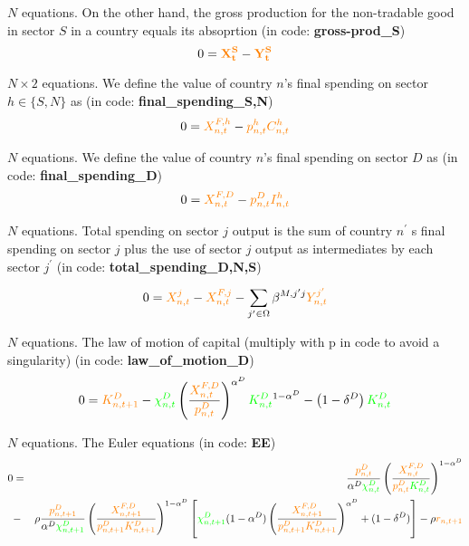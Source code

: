 \documentclass[12pt, bibtotoc, tablecaptionabove, figurecaptionabove, fleqn]{article}
\newcommand{\cl}[1]{{\color{orange}{#1}}}
\newcommand{\st}[1]{{\color{green}{#1}}}
\begin{document}
\noindent $N$ equations. On the other hand, the gross production for the non-tradable good in sector $S$ in a country equals its absoprtion (in code: {\bf{gross-prod\_S}})
\begin{equation}
0 = \mathbf{\cl{X^S_t}} -  \mathbf{\cl{Y^S_t}}
\end{equation}

\noindent $N \times 2$ equations. We define the value of country $n$'s final spending on sector $h \in \{S,N\}$ as (in code: {\bf{final\_spending\_S,N}}) 
\begin{equation}
0 = \cl{ X^{F,h}_{n,t}} - \cl{p^h_{n,t}} \cl{C^h_{n,t}}
\end{equation}

\noindent $N$ equations. We define the value of country $n$'s final spending on sector $D$ as  
(in code: {\bf{final\_spending\_D}}) 
\begin{equation}
0 = \cl{ X^{F,D}_{n,t}} - \cl{p^D_{n,t}} \cl{I^h_{n,t}}
\end{equation}

\noindent $N$ equations. Total spending on sector $j$ output is the sum of country $n^{\prime}$ s final spending on sector $j$
plus the use of sector $j$ output as intermediates by each sector $j^{\prime}$ (in code: {\bf{total\_spending\_D,N,S}}) 

\begin{equation}
0 = \cl{X_{n, t}^{j}} - \cl{X_{n, t}^{F, j}} - \sum_{j^{\prime} \in \Omega} \beta^{M, j^{\prime} j} \cl{Y_{n, t}^{j^{\prime}}}
\end{equation}

\noindent $N$ equations. The law of motion of capital (multiply with p in code to avoid a singularity) (in code: {\bf{law\_of\_motion\_D}}) 
\begin{equation}
0 = \cl{K^D_{n,t+1}} - \st{\chi^D_{n,t}} \left( \frac{\cl{X_{n,t}^{F,D}}}{\cl{p_{n,t}^D}} \right)^{\alpha^D} \st{K^D_{n,t}}^{1-\alpha^D} - \left(1 - \delta^D\right) \st{K^D_{n,t}}
\end{equation}

\noindent $N$ equations. The Euler equations (in code: {\bf{EE}})
\begin{eqnarray}
0 &=& \frac{\cl{p_{n, t}^{D}}}{\alpha^D \st{\chi^D_{n, t}}}\left(\frac{\cl{X_{n, t}^{F,D}}}{\cl{p_{n, t}^{D}} \st{K^D_{n, t}}}\right)^{1-\alpha^D} \\
&-& \rho \frac{\cl{p_{n, t+1}^{D}}}{\alpha^D \st{\chi^D_{n, t+1}}}\left(\frac{\cl{X_{n, t+1}^{F,D}}}{\cl{p_{n, t+1}^{D}} \cl{K^D_{n, t+1}}}\right)^{1-\alpha^D}\left[\st{\chi^D_{n, t+1}}(1-\alpha^D)\left(\frac{\cl{X_{n, t+1}^{F,D}}}{\cl{p_{n, t+1}^{D}} \cl{K^D_{n, t+1}}}\right)^{\alpha^D}+(1-\delta^D)\right]-\rho \cl{r_{n, t+1}}\nonumber
\end{eqnarray}
\end{document}
